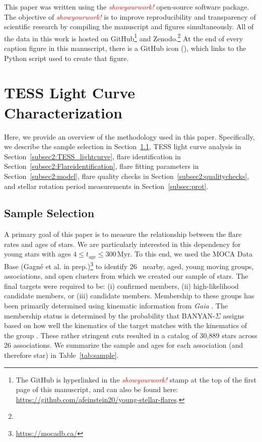 \documentclass[twocolumn]{aastex631}
\begin{document}
This paper was written using the \textcolor{red}{\textit{showyourwork!}} open-source
software package. The objective of \textcolor{red}{\textit{showyourwork!}} is to improve reproducibility
and transparency of scientific research by compiling the manuscript and figures
simultaneously. All of the data in this work is hosted on GitHub\footnote{The GitHub is
hyperlinked in the \textcolor{red}{\textit{showyourwork!}} stamp at the top of the first page of this manuscript,
 and can also be found here: \url{https://github.com/afeinstein20/young-stellar-flares}.} and
 Zenodo.\footnote{} At the end of every caption figure in this manuscript, there is a GitHub icon
 (\faGithub), which links to the Python script used to create that figure.

\section{TESS Light Curve Characterization}\label{sec:methods}

Here, we provide an overview of the methodology used in this paper. Specifically, we describe
the sample selection in Section~\ref{subsec2:sample}, TESS light curve analysis in
Section~\ref{subsec2:TESS_lightcurve}, flare identification in Section~\ref{subsec2:Flareidentification},
flare fitting parameters in Section~\ref{subsec2:model}, flare quality checks in
Section~\ref{subsec2:qualitychecks}, and  stellar rotation period measurements in Section~\ref{subsec:prot}.

\subsection{Sample Selection}\label{subsec2:sample}

A primary goal of this paper is to measure the relationship between the flare rates and
ages of stars. We are particularly interested in this dependency for young stars with ages
$4 \leq t_\textrm{age} \leq 300$\,Myr. To this end, we used the MOCA Data Base (Gagné et al.
in prep.)\footnote{\url{https://mocadb.ca/}} to identify 26~ nearby, aged, young moving groups,
associations, and open clusters from which we created our sample of stars. The final targets
were required to be: (i) confirmed members, (ii) high-likelihood candidate members, or (iii)
candidate members.  Membership to these groups has been primarily determined using kinematic
information from \textit{Gaia} \citep{gaia16, gaia18}. The membership status is determined by
the probability that BANYAN-$\Sigma$ assigns based on how well the kinematics of the target
matches with the kinematics of the group \citep{gagne18}. These rather stringent cuts resulted
in a catalog of 30,889 stars across 26 associations. We summarize the sample and ages for each
association (and therefore star) in Table~\ref{tab:sample}.
\end{document}
